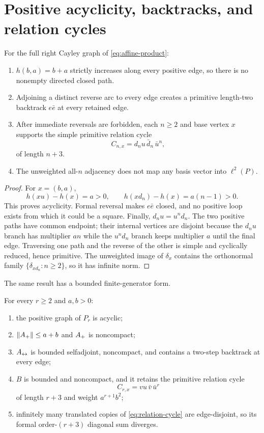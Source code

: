 \section{Positive acyclicity, backtracks, and relation cycles}
\label{sec:trichotomy}

\begin{theorem}
\label{thm:full-trichotomy}
For the full right Cayley graph of \cref{eq:affine-product}:
\begin{enumerate}
\item $h(b,a)=b+a$ strictly increases along every positive edge, so there is
no nonempty directed closed path.
\item Adjoining a distinct reverse arc to every edge creates a primitive
length-two backtrack $e\bar e$ at every retained edge.
\item After immediate reversals are forbidden, each $n\ge2$ and base vertex
$x$ supports the simple primitive relation cycle
\[
C_{n,x}=d_nu\,\bar d_n\,\bar u^n,
\]
of length $n+3$.
\item The unweighted all-$n$ adjacency does not map any basis vector into
$\ell^2(P)$.
\end{enumerate}
\end{theorem}

\begin{proof}
For $x=(b,a)$,
\[
h(xu)-h(x)=a>0,
\qquad h(xd_n)-h(x)=a(n-1)>0.
\]
This proves acyclicity.  Formal reversal makes $e\bar e$ closed, and no
positive loop exists from which it could be a square.  Finally,
$d_nu=u^nd_n$.  The two positive paths have common endpoint; their internal
vertices are disjoint because the $d_nu$ branch has multiplier $an$ while
the $u^nd_n$ branch keeps multiplier $a$ until the final edge.  Traversing
one path and the reverse of the other is simple and cyclically reduced, hence
primitive.  The unweighted image of $\delta_x$ contains the orthonormal
family $\{\delta_{xd_n}:n\ge2\}$, so it has infinite norm.
\end{proof}

The same result has a bounded finite-generator form.

\begin{theorem}
\label{thm:bounded-benchmark}
For every $r\ge2$ and $a,b>0$:
\begin{enumerate}
\item the positive graph of $P_r$ is acyclic;
\item $\|A_{+}\|\le a+b$ and $A_{+}$ is noncompact;
\item $A_{\leftrightarrow}$ is bounded selfadjoint, noncompact, and contains a two-step
backtrack at every edge;
\item $B$ is bounded and noncompact, and it retains the primitive relation
cycle
\begin{equation}
C_{r,x}=vu\,\bar v\,\bar u^r
\label{eq:relation-cycle}
\end{equation}
of length $r+3$ and weight $a^{r+1}b^2$;
\item infinitely many translated copies of \cref{eq:relation-cycle} are
edge-disjoint, so its formal order-$(r+3)$ diagonal sum diverges.
\end{enumerate}
\end{theorem}

